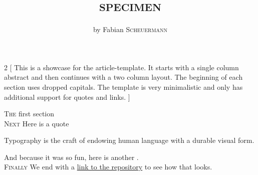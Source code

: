 \documentclass[11pt,a4paper]{article}
\title{\scshape specimen}
\author{by Fabian \textsc{Scheuermann}}
\date{}
\begin{document}
\maketitle
\begin{multicols}{2}
[
This is a showcase for the article-template. It starts with a single column abstract and then continues with a two column layout. The beginning of each section uses dropped capitals. The template is very minimalistic and only has additional support for quotes and links. 
]

\lettrine[lines=2,nindent=0.em]{T}{he} first section \blindtext \\

\lettrine[lines=2,nindent=0.em]{N}{ext} \blindtext 
Here is a quote
\begin{displayquote}
Typography is the craft of endowing human language with a durable visual form.
\end{displayquote}

\blindtext
And because it was so fun, here is another . \\

\lettrine[lines=2,nindent=0.em]{F}{inally} \blindtext \blindtext We end with a \href{https://github.com/fschmnn/article-template}{link to the repository} to see how that looks.
\end{multicols}
\end{document}
